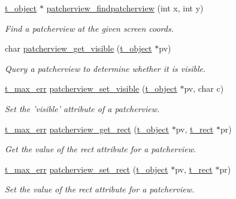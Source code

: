 \begin{DoxyCompactItemize}
\item 
\hyperlink{structt__object}{t\_\-object} $\ast$ \hyperlink{group__jpatcherview_ga143a54662c1dea4f8170c7b62bc4cb2d}{patcherview\_\-findpatcherview} (int x, int y)
\begin{DoxyCompactList}\small\item\em Find a patcherview at the given screen coords. \item\end{DoxyCompactList}\item 
char \hyperlink{group__jpatcherview_gaf9621ecabdae9fc9d865bd42a8bc43a9}{patcherview\_\-get\_\-visible} (\hyperlink{structt__object}{t\_\-object} $\ast$pv)
\begin{DoxyCompactList}\small\item\em Query a patcherview to determine whether it is visible. \item\end{DoxyCompactList}\item 
\hyperlink{group__datatypes_ga73edaae82b318855cc09fac994918165}{t\_\-max\_\-err} \hyperlink{group__jpatcherview_gab8b3bb74c2341f42a1b8fb3a1dbdcbb8}{patcherview\_\-set\_\-visible} (\hyperlink{structt__object}{t\_\-object} $\ast$pv, char c)
\begin{DoxyCompactList}\small\item\em Set the 'visible' attribute of a patcherview. \item\end{DoxyCompactList}\item 
\hyperlink{group__datatypes_ga73edaae82b318855cc09fac994918165}{t\_\-max\_\-err} \hyperlink{group__jpatcherview_ga310590cbb1dd9fbe5c8c228e35fe11ef}{patcherview\_\-get\_\-rect} (\hyperlink{structt__object}{t\_\-object} $\ast$pv, \hyperlink{structt__rect}{t\_\-rect} $\ast$pr)
\begin{DoxyCompactList}\small\item\em Get the value of the rect attribute for a patcherview. \item\end{DoxyCompactList}\item 
\hyperlink{group__datatypes_ga73edaae82b318855cc09fac994918165}{t\_\-max\_\-err} \hyperlink{group__jpatcherview_ga6025a5acb336aa81a0aad67e9de5bbca}{patcherview\_\-set\_\-rect} (\hyperlink{structt__object}{t\_\-object} $\ast$pv, \hyperlink{structt__rect}{t\_\-rect} $\ast$pr)
\begin{DoxyCompactList}\small\item\em Set the value of the rect attribute for a patcherview. \item\end{DoxyCompactList}\item 

\end{DoxyCompactItemize}
